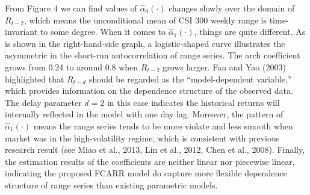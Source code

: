 \documentclass[
journal=jacsat, %
manuscript=article]{achemso}
\begin{document}
\begin{CJK*}{UTF8}{song}
From Figure 4 we can find values of $\hat{\alpha}_0(\cdot)$ changes slowly over the domain of $R_{t-2}$, which means the unconditional mean of CSI 300 weekly range is time-invariant to some degree. When it comes to $\hat{\alpha}_1(\cdot)$, things are quite different. As is shown in the right-hand-side graph, a logistic-shaped curve illustrates the asymmetric in the short-run autocorrelation of range series. The arch coefficient grows from 0.24 to around 0.8 when $R_{t-2}$ grows larger. Fan and Yao (2003) highlighted that $R_{t-d}$ should be regarded as the “model-dependent variable,” which provides information on the dependence structure of the observed data. The delay parameter $d=2$ in this case indicates the historical returns will internally reflected in the model with one day lag. Moreover, the pattern of $\hat{\alpha}_1(\cdot)$ means the range series tends to be more violate and less smooth when market was in the high-volatility regime, which is consistent with previous research result (see Miao et al., 2013, Lin et al., 2012, Chen et al., 2008). Finally, the estimation results of the coefficients are neither linear nor piecewise linear, indicating the proposed FCARR model do capture more flexible dependence structure of range series than existing parametric models.


\end{CJK*}
\end{document}
